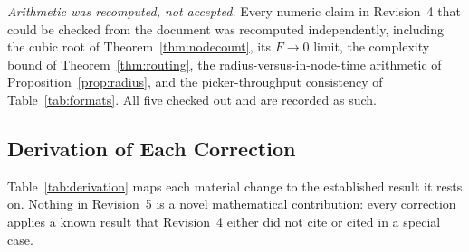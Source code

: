 \documentclass[10pt,twocolumn,letterpaper]{article}
\theoremstyle{definition}
\begin{document}
\emph{Arithmetic was recomputed, not accepted.} Every numeric claim in Revision~4 that could be checked from the document was recomputed independently, including the cubic root of Theorem~\ref{thm:nodecount}, its $F\to0$ limit, the complexity bound of Theorem~\ref{thm:routing}, the radius-versus-in-node-time arithmetic of Proposition~\ref{prop:radius}, and the picker-throughput consistency of Table~\ref{tab:formats}. All five checked out and are recorded as such.

\subsection{Derivation of Each Correction}

Table~\ref{tab:derivation} maps each material change to the established result it rests on. Nothing in Revision~5 is a novel mathematical contribution: every correction applies a known result that Revision~4 either did not cite or cited in a special case.
\end{document}
